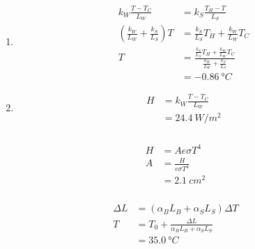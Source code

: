 \documentclass{article}
\begin{document}
\begin{enumerate}
  \item

        \begin{align*}
          k_W \frac{T - T_C}{L_W}                            & = k_S \frac{T_H - T}{L_S}                                                             \\
          \left( \frac{k_W}{L_W} + \frac{k_S}{L_S} \right) T & = \frac{k_S}{L_S} T_H + \frac{k_W}{L_W} T_C                                           \\
          T                                                  & = \frac{\frac{k_S}{L_S} T_H + \frac{k_W}{L_W} T_C}{\frac{k_W}{L_W} + \frac{k_S}{L_S}} \\
                                                             & = \qty{-0.86}{\degree C}
        \end{align*}

  \item

        \begin{align*}
          H & = k_W \frac{T - T_C}{L_W} \\
            & = \qty{24.4}{W/m^2}
        \end{align*}
\end{enumerate}

\setcounter{subsubsection}{64}
\subsubsection{}

\begin{align*}
  H & = A e \sigma T^4         \\
  A & = \frac{H}{e \sigma T^4} \\
    & = \qty{2.1}{cm^2}
\end{align*}

\setcounter{subsubsection}{68}
\subsubsection{}

\begin{align*}
  \Delta L & = (\alpha_B L_B + \alpha_S L_S) \Delta T             \\
  T        & = T_0 + \frac{\Delta L}{\alpha_B L_B + \alpha_S L_S} \\
           & = \qty{35.0}{\degree C}
\end{align*}
\end{document}
